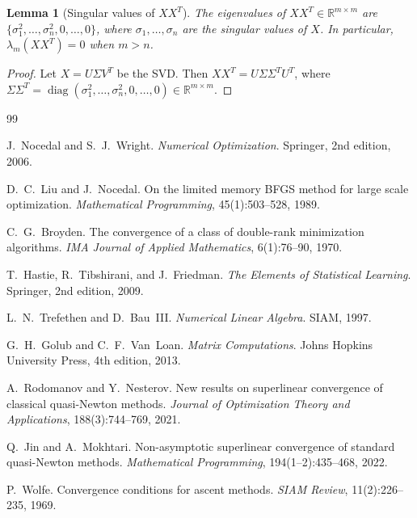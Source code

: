 \documentclass[11pt,a4paper]{article}
\newtheorem{lemma}[theorem]{Lemma}
\newcommand{\R}{\mathbb{R}}
\DeclareMathOperator{\diag}{diag}
\begin{document}
\begin{lemma}[Singular values of $XX^T$]
\label{lemma:singvals}
The eigenvalues of $XX^T \in \R^{m \times m}$ are 
$\{\sigma_1^2, \ldots, \sigma_n^2, 0, \ldots, 0\}$, where $\sigma_1, \ldots, \sigma_n$ 
are the singular values of $X$. In particular, $\lambda_m(XX^T) = 0$ when $m > n$.
\end{lemma}
\begin{proof}
Let $X = U\Sigma V^T$ be the SVD. Then $XX^T = U\Sigma\Sigma^T U^T$, 
where $\Sigma\Sigma^T = \diag(\sigma_1^2, \ldots, \sigma_n^2, 0, \ldots, 0) \in \R^{m \times m}$.
\end{proof}



\begin{thebibliography}{99}

J.~Nocedal and S.~J.~Wright.
\newblock \emph{Numerical Optimization}.
\newblock Springer, 2nd edition, 2006.

D.~C.~Liu and J.~Nocedal.
\newblock On the limited memory {BFGS} method for large scale optimization.
\newblock \emph{Mathematical Programming}, 45(1):503--528, 1989.

C.~G.~Broyden.
\newblock The convergence of a class of double-rank minimization algorithms.
\newblock \emph{IMA Journal of Applied Mathematics}, 6(1):76--90, 1970.

T.~Hastie, R.~Tibshirani, and J.~Friedman.
\newblock \emph{The Elements of Statistical Learning}.
\newblock Springer, 2nd edition, 2009.

L.~N.~Trefethen and D.~Bau~III.
\newblock \emph{Numerical Linear Algebra}.
\newblock SIAM, 1997.

G.~H.~Golub and C.~F.~Van~Loan.
\newblock \emph{Matrix Computations}.
\newblock Johns Hopkins University Press, 4th edition, 2013.

A.~Rodomanov and Y.~Nesterov.
\newblock New results on superlinear convergence of classical quasi-{N}ewton methods.
\newblock \emph{Journal of Optimization Theory and Applications}, 188(3):744--769, 2021.

Q.~Jin and A.~Mokhtari.
\newblock Non-asymptotic superlinear convergence of standard quasi-{N}ewton methods.
\newblock \emph{Mathematical Programming}, 194(1--2):435--468, 2022.

P.~Wolfe.
\newblock Convergence conditions for ascent methods.
\newblock \emph{SIAM Review}, 11(2):226--235, 1969.

\end{thebibliography}
\end{document}
